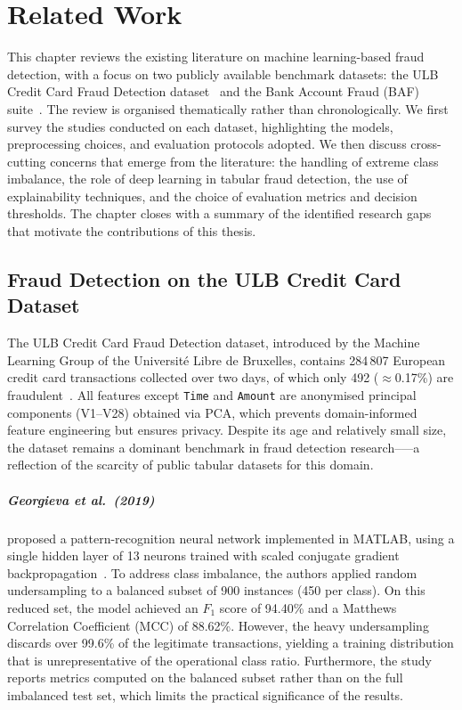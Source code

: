 \chapter{Related Work}
\label{sec:chapterRelatedWork}

This chapter reviews the existing literature on machine learning-based fraud detection, with a focus on two publicly available benchmark datasets: the ULB Credit Card Fraud Detection dataset~\cite{ulb2013} and the Bank Account Fraud (BAF) suite~\cite{jesus2022turning}. The review is organised thematically rather than chronologically. We first survey the studies conducted on each dataset, highlighting the models, preprocessing choices, and evaluation protocols adopted. We then discuss cross-cutting concerns that emerge from the literature: the handling of extreme class imbalance, the role of deep learning in tabular fraud detection, the use of explainability techniques, and the choice of evaluation metrics and decision thresholds. The chapter closes with a summary of the identified research gaps that motivate the contributions of this thesis.

\section{Fraud Detection on the ULB Credit Card Dataset}
\label{sec:rw_ulb}

The ULB Credit Card Fraud Detection dataset, introduced by the Machine Learning Group of the Université Libre de Bruxelles, contains 284\,807 European credit card transactions collected over two days, of which only 492 ($\approx$0.17\%) are fraudulent~\cite{ulb2013}. All features except \texttt{Time} and \texttt{Amount} are anonymised principal components (V1--V28) obtained via PCA, which prevents domain-informed feature engineering but ensures privacy. Despite its age and relatively small size, the dataset remains a dominant benchmark in fraud detection research--—a reflection of the scarcity of public tabular datasets for this domain.

\paragraph{Georgieva et al.\ (2019)}
proposed a pattern-recognition neural network implemented in MATLAB, using a single hidden layer of 13 neurons trained with scaled conjugate gradient backpropagation~\cite{georgieva2019neural}. To address class imbalance, the authors applied random undersampling to a balanced subset of 900 instances (450 per class). On this reduced set, the model achieved an $F_1$ score of 94.40\% and a Matthews Correlation Coefficient (MCC) of 88.62\%. However, the heavy undersampling discards over 99.6\% of the legitimate transactions, yielding a training distribution that is unrepresentative of the operational class ratio. Furthermore, the study reports metrics computed on the balanced subset rather than on the full imbalanced test set, which limits the practical significance of the results.

